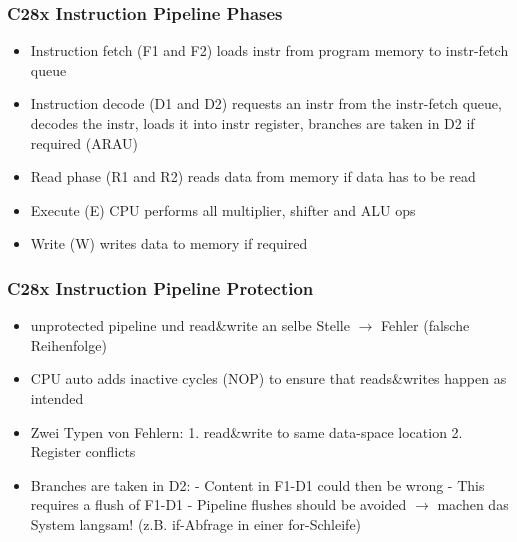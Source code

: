 \begin{minipage}{0.5\textwidth}
\subsubsection{C28x Instruction Pipeline Phases}
\begin{itemize}
  \item Instruction fetch (F1 and F2) loads instr from program memory to instr-fetch queue
  \vspace{-0.8\baselineskip}
  \item Instruction decode (D1 and D2) requests an instr from the instr-fetch queue, decodes the instr, loads it into instr register, branches are taken in D2 if required (ARAU)
  \vspace{-0.8\baselineskip}
  \item Read phase (R1 and R2) reads data from memory if data has to be read
  \vspace{-0.8\baselineskip}
  \item Execute (E) CPU performs all multiplier, shifter and ALU ops
  \vspace{-0.8\baselineskip}
  \item Write (W) writes data to memory if required
\end{itemize}
 \vspace{-0.8\baselineskip}
 \subsubsection{C28x Instruction Pipeline Protection}
 \vspace{-0.8\baselineskip}
 \begin{itemize}
 \item unprotected pipeline und read\&write an selbe Stelle $\rightarrow$ Fehler (falsche Reihenfolge)
  \vspace{-0.8\baselineskip}
 \item CPU auto adds inactive cycles (NOP) to ensure that reads\&writes happen as intended
  \vspace{-0.8\baselineskip}
  \item Zwei Typen von Fehlern: 1. read\&write to same data-space location 2. Register conflicts
\end{itemize}
\end{minipage}
\begin{itemize}
 \item Branches are taken in D2: - Content in F1-D1 could then be wrong
 - This requires a flush of F1-D1 - Pipeline flushes should be avoided $\rightarrow$ machen das System langsam! (z.B. if-Abfrage in einer for-Schleife)
\end{itemize}
